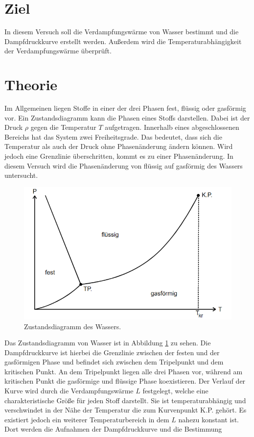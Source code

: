 \section{Ziel}
In diesem Versuch soll die Verdampfungswärme von Wasser bestimmt und die Dampfdruckkurve erstellt werden.
Außerdem wird die Temperaturabhängigkeit der Verdampfungswärme überprüft.
\section{Theorie}
\label{sec:Theorie}
Im Allgemeinen liegen Stoffe in einer der drei Phasen fest, flüssig oder gasförmig vor.
Ein Zustandsdiagramm kann die Phasen eines Stoffs darstellen. Dabei ist der Druck $\rho$ gegen die Temperatur $T$ aufgetragen. Innerhalb eines abgeschlossenen Bereichs 
hat das System zwei Freiheitsgrade. Das bedeutet, dass sich die Temperatur als auch der Druck ohne Phasenänderung ändern können. Wird jedoch eine Grenzlinie überschritten,
kommt es zu einer Phasenänderung. 
In diesem Versuch wird die Phasenänderung von flüssig auf gasförmig des Wassers untersucht. 
\begin{figure}
    \centering
    \caption{Zustandsdiagramm des Wassers.\cite{v203}}
    \label{fig:zus}
    \includegraphics[width = 0.6 \textwidth]{pics/Phasendiagramm.png}
\end{figure}
Das Zustandsdiagramm von Wasser ist in Abbildung \ref{fig:zus} zu sehen. Die Dampfdruckkurve ist hierbei die Grenzlinie zwischen der festen und der gasförmigen Phase und befindet sich zwischen dem Tripelpunkt und dem kritischen Punkt.
An dem Tripelpunkt liegen alle drei Phasen vor, während am kritischen Punkt die gasförmige und flüssige Phase koexistieren. Der Verlauf der Kurve wird durch 
die Verdampfungswärme $L$ festgelegt, welche eine charakteristische Größe für jeden Stoff darstellt. Sie ist temperaturabhängig und verschwindet in der Nähe der Temperatur die
zum Kurvenpunkt K.P. gehört. Es existiert jedoch ein weiterer Temperaturbereich in dem $L$ nahezu konstant ist. Dort werden die Aufnahmen der Dampfdruckkurve und die Bestimmung
